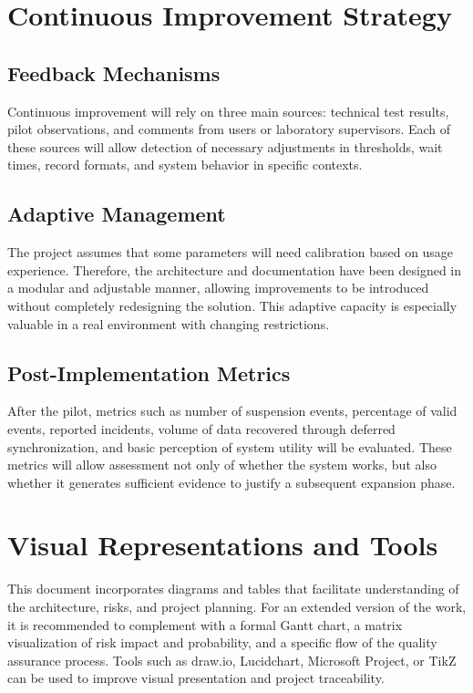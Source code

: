 \documentclass[12pt,a4paper]{article}
\begin{document}
\section{Continuous Improvement Strategy}

\subsection{Feedback Mechanisms}
Continuous improvement will rely on three main sources: technical test results, pilot observations, and comments from users or laboratory supervisors. Each of these sources will allow detection of necessary adjustments in thresholds, wait times, record formats, and system behavior in specific contexts.

\subsection{Adaptive Management}
The project assumes that some parameters will need calibration based on usage experience. Therefore, the architecture and documentation have been designed in a modular and adjustable manner, allowing improvements to be introduced without completely redesigning the solution. This adaptive capacity is especially valuable in a real environment with changing restrictions.

\subsection{Post-Implementation Metrics}
After the pilot, metrics such as number of suspension events, percentage of valid events, reported incidents, volume of data recovered through deferred synchronization, and basic perception of system utility will be evaluated. These metrics will allow assessment not only of whether the system works, but also whether it generates sufficient evidence to justify a subsequent expansion phase.

\section{Visual Representations and Tools}
This document incorporates diagrams and tables that facilitate understanding of the architecture, risks, and project planning. For an extended version of the work, it is recommended to complement with a formal Gantt chart, a matrix visualization of risk impact and probability, and a specific flow of the quality assurance process. Tools such as draw.io, Lucidchart, Microsoft Project, or TikZ can be used to improve visual presentation and project traceability.
\end{document}
